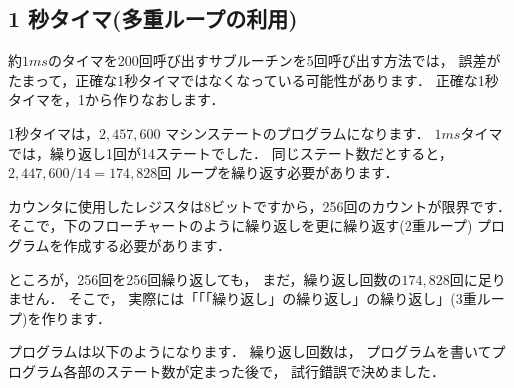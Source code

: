\subsection{1 秒タイマ(多重ループの利用)}

約$1ms$のタイマを200回呼び出すサブルーチンを5回呼び出す方法では，
誤差がたまって，正確な1秒タイマではなくなっている可能性があります．
正確な1秒タイマを，1から作りなおします．

1秒タイマは，$2,457,600$ マシンステートのプログラムになります．
$1ms$タイマでは，繰り返し1回が14ステートでした．
同じステート数だとすると，
$2,447,600 / 14 = 174,828回$ ループを繰り返す必要があります．

カウンタに使用したレジスタは8ビットですから，256回のカウントが限界です．
そこで，下のフローチャートのように繰り返しを更に繰り返す(2重ループ)
プログラムを作成する必要があります．

\begin{center}
\epsfxsize=5cm
\end{center}

ところが，256回を256回繰り返しても，
まだ，繰り返し回数の$174,828回$に足りません．
そこで，
実際には「「「繰り返し」の繰り返し」の繰り返し」(3重ループ)を作ります．

プログラムは以下のようになります．
繰り返し回数は，
プログラムを書いてプログラム各部のステート数が定まった後で，
試行錯誤で決めました．


